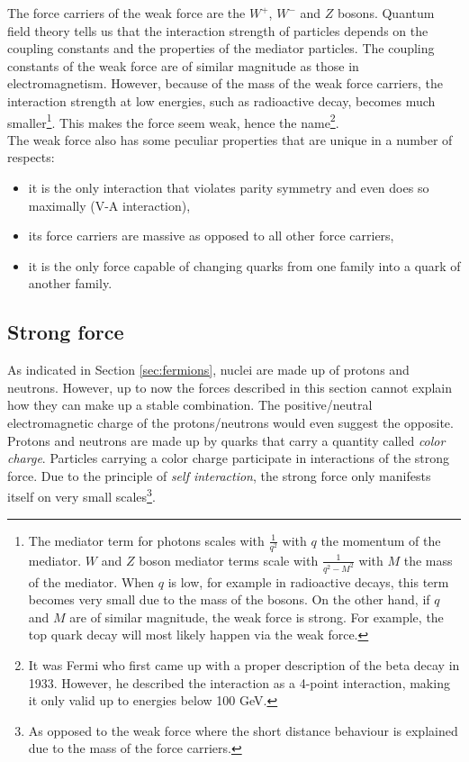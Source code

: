 The force carriers of the weak force are the $W^+$, $W^-$ and $Z$ bosons. 
Quantum field theory tells us that the interaction strength of particles depends on the coupling constants and the properties of the mediator particles. The coupling constants of the weak force are of similar magnitude as those in electromagnetism. However, because of the mass of the weak force carriers, the interaction strength at low energies, such as radioactive decay, becomes much smaller\footnote{The mediator term for photons scales with $\frac{1}{q^2}$ with  $q$ the momentum of the mediator. $W$ and $Z$ boson mediator terms scale with $\frac{1}{q^2 - M^2}$ with $M$ the mass of the mediator. When $q$ is low, for example in radioactive decays, this term becomes very small due to the mass of the bosons. On the other hand, if $q$ and $M$ are of similar magnitude, the weak force is strong. For example, the top quark decay will most likely happen via the weak force.}. This makes the force seem weak, hence the name\footnote{It was Fermi who first came up with a proper description of the beta decay in 1933. However, he described the interaction as a 4-point interaction, making it only valid up to energies below 100 GeV.}.\\

\noindent The weak force also has some peculiar properties that are unique in a number of respects:

\vspace{2mm}
\begin{itemize}
\item it is the only interaction that violates parity symmetry and even does so maximally (V-A interaction),
\item its force carriers are massive as opposed to all other force carriers,
\item it is the only force capable of changing quarks from one family into a quark of another family.
\end{itemize}

\subsection{Strong force}
\label{subsec:strong}
As indicated in Section \ref{sec:fermions}, nuclei are made up of protons and neutrons. However, up to now the forces described in this section cannot explain how they can make up a stable combination. The positive/neutral electromagnetic charge of the protons/neutrons would even suggest the opposite. Protons and neutrons are made up by quarks that carry a quantity called \textit{color charge}. Particles carrying a color charge participate in interactions of the strong force. Due to the principle of \textit{self interaction}, the strong force only manifests itself on very small scales\footnote{As opposed to the weak force where the short distance behaviour is explained due to the mass of the force carriers.}.

